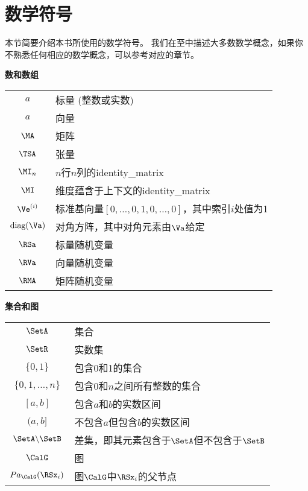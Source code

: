 \chapter*{数学符号}
\label{notation}



本节简要介绍本书所使用的数学符号。
我们在至中描述大多数数学概念，如果你不熟悉任何相应的数学概念，可以参考对应的章节。

\vspace{\notationgap}
\begin{minipage}{\textwidth}
\centerline{\bf 数和数组}
\bgroup
\def\arraystretch{1.5}
\begin{tabular}{cp{3.25in}}
$\displaystyle a$ & 标量 (整数或实数) \\
$\displaystyle \boldsymbol{\mathit{a}}$ & 向量 \\
$\displaystyle \MA$ & 矩阵 \\
$\displaystyle \TSA$ & 张量 \\
$\displaystyle \MI_n$ & $n$行$n$列的\gls{identity_matrix} \\
    $\displaystyle \MI$ &  维度蕴含于上下文的\gls{identity_matrix} \\
$\displaystyle \Ve^{(i)}$ & 标准基向量$[0,\dots,0,1,0,\dots,0]$，其中索引$i$处值为1 \\
$\displaystyle \text{diag}(\Va)$ & 对角方阵，其中对角元素由$\Va$给定 \\
$\displaystyle \RSa$ & 标量随机变量 \\
$\displaystyle \RVa$ & 向量随机变量 \\
$\displaystyle \RMA$ & 矩阵随机变量 \\
\end{tabular}
\egroup
\end{minipage}

\vspace{\notationgap}
\begin{minipage}{\textwidth}
\centerline{\bf 集合和图}
\bgroup
\def\arraystretch{1.5}
\begin{tabular}{cp{3.25in}}
$\displaystyle \SetA$ & 集合 \\
$\displaystyle \SetR$ & 实数集 \\
$\displaystyle \{0, 1\}$ & 包含0和1的集合 \\
$\displaystyle \{0, 1, \dots, n \}$ & 包含$0$和$n$之间所有整数的集合 \\
$\displaystyle [a, b]$ & 包含$a$和$b$的实数区间 \\
$\displaystyle (a, b]$ & 不包含$a$但包含$b$的实数区间 \\
$\displaystyle \SetA \backslash \SetB$ & 差集，即其元素包含于$\SetA$但不包含于$\SetB$\\
$\displaystyle \CalG$ & 图 \\
$\displaystyle Pa_\CalG(\RSx_i)$ & 图$\CalG$中$\RSx_i$的父节点
\end{tabular}
\egroup
\end{minipage}

